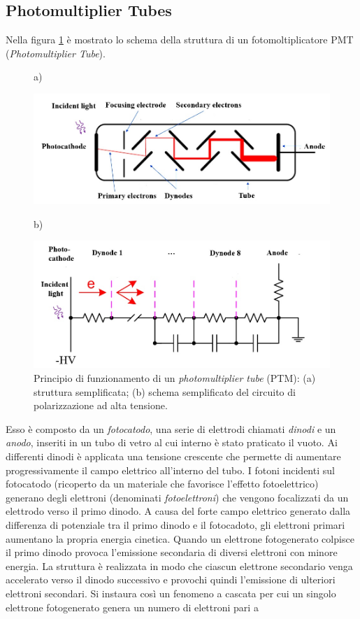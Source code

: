 \subsection{Photomultiplier Tubes}
Nella figura \ref{fig:ptm} è mostrato lo schema della struttura di un fotomoltiplicatore PMT (\textit{Photomultiplier Tube}).
\begin{figure}[b!]
	\centering
	a)
	\begin{minipage}{.70\textwidth}
		\includegraphics[width=\linewidth]{./ImageFiles/ptm.jpg}
	\end{minipage}

	b)
	\begin{minipage}{.70\textwidth}
		\includegraphics[width=\linewidth]{./ImageFiles/ptm_schema.jpg}
	\end{minipage}
	\caption{Principio di funzionamento di un \textit{photomultiplier tube} (PTM): (a) struttura semplificata; (b) schema semplificato del circuito di polarizzazione ad alta tensione\cite{Jiang2019}.}
	\label{fig:ptm}
\end{figure}
Esso è composto da un \textit{fotocatodo}, una serie di elettrodi chiamati \textit{dinodi} e un \textit{anodo}, inseriti in un tubo di vetro al cui interno è stato praticato il vuoto. Ai differenti dinodi è applicata una tensione crescente che permette di aumentare progressivamente il campo elettrico all'interno del tubo. I fotoni incidenti sul fotocatodo (ricoperto da un materiale che favorisce l'effetto fotoelettrico) generano degli elettroni (denominati \textit{fotoelettroni}) che vengono focalizzati da un elettrodo verso il primo dinodo. A causa del forte campo elettrico generato dalla differenza di potenziale tra il primo dinodo e il fotocadoto, gli elettroni primari aumentano la propria energia cinetica. Quando un elettrone fotogenerato colpisce il primo dinodo provoca l'emissione secondaria di diversi elettroni con minore energia. La struttura è realizzata in modo che ciascun elettrone secondario venga accelerato verso il dinodo successivo e provochi quindi l'emissione di ulteriori elettroni secondari. Si instaura così un fenomeno a cascata per cui un singolo elettrone fotogenerato genera un numero di elettroni pari a 
